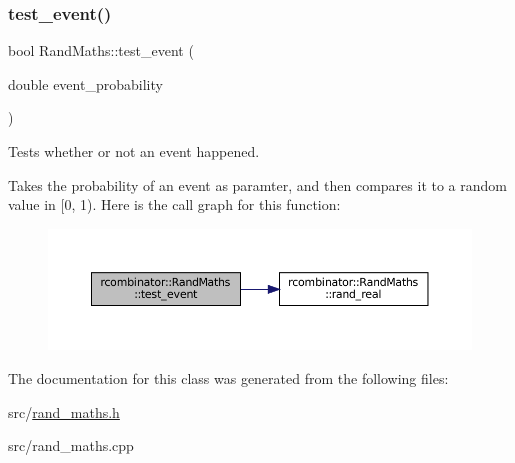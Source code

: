 \subsubsection{\texorpdfstring{test\+\_\+event()}{test\_event()}}
{\footnotesize\ttfamily bool Rand\+Maths\+::test\+\_\+event (\begin{DoxyParamCaption}\item[{double}]{event\+\_\+probability }\end{DoxyParamCaption})\hspace{0.3cm}{\ttfamily [inline]}}



Tests whether or not an event happened. 

Takes the probability of an event as paramter, and then compares it to a random value in \mbox{[}0, 1). Here is the call graph for this function\+:\nopagebreak
\begin{figure}[H]
\begin{center}
\leavevmode
\includegraphics[width=350pt]{classrcombinator_1_1RandMaths_a183686140a9da18ad40c7e048ee8914e_cgraph}
\end{center}
\end{figure}


The documentation for this class was generated from the following files\+:\begin{DoxyCompactItemize}
\item 
src/\mbox{\hyperlink{rand__maths_8h}{rand\+\_\+maths.\+h}}\item 
src/rand\+\_\+maths.\+cpp\end{DoxyCompactItemize}
